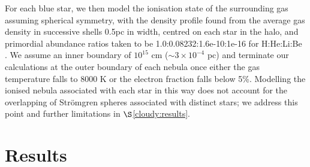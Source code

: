 \documentclass[graphics, twocolumn, usenatbib]{mn2e}
\begin{document}
For each blue star, we then model the ionisation state of the surrounding gas assuming spherical
symmetry, with the density profile found from the average gas density in successive shells 0.5pc
in width, centred on each star in the halo, and primordial abundance ratios taken to be
1.0:0.08232:1.6e-10:1e-16 for H:He:Li:Be \citep[consistent with the results of the][table 2, see
  {\sc cloudy} documentation for further discussion]{Planck_2014}. We assume an inner boundary
of $10^{15}$ cm ($\sim 3 \times 10^{-4}$ pc) and terminate our calculations at the outer boundary of
each nebula once either the gas temperature falls to 8000 K or the electron fraction falls below 5\%.
Modelling the ionised nebula associated with each star in this way does not account for the
overlapping of Str{\"o}mgren spheres associated with distinct stars; we address this point and
further limitations in $\S$\ref{cloudy:results}.


\section{Results} \label{Sec:Results}
\end{document}
